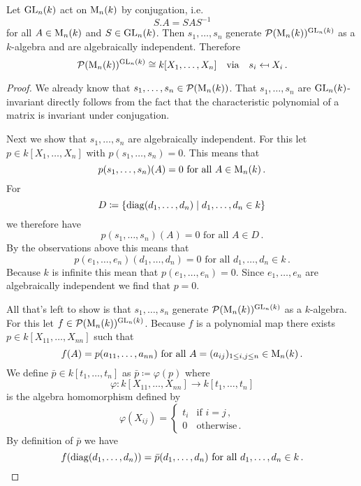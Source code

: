 \begin{thrm}
  Let $\operatorname{GL}_n(k)$ act on $\operatorname{M}_n(k)$ by conjugation, i.e.\
  \[
      S.A
    = SAS^{-1}
  \]
  for all $A \in \operatorname{M}_n(k)$ and $S \in \operatorname{GL}_n(k)$.
  Then $s_1, \dotsc, s_n$ generate $\mathcal{P}(\operatorname{M}_n(k))^{\operatorname{GL}_n(k)}$ as a $k$-algebra and are algebraically independent.
  Therefore
  \[
              \mathcal{P}(\operatorname{M}_n(k))^{\operatorname{GL}_n(k)}
    \cong     k[X_1, \dotsc, X_n]
    \quad\text{via}\quad
              s_i
    \mapsfrom X_i \,.
  \]
\end{thrm}
\begin{proof}
  We already know that $s_1, \dotsc, s_n \in \mathcal{P}(\operatorname{M}_n(k))$.
  That $s_1, \dotsc, s_n$ are $\operatorname{GL}_n(k)$-invariant directly follows from the fact that the characteristic polynomial of a matrix is invariant under conjugation.
  
  Next we show that $s_1, \dotsc, s_n$ are algebraically independent.
  For this let $p \in k[X_1, \dotsc, X_n]$ with $p(s_1, \dotsc, s_n) = 0$.
  This means that
  \[
        p(s_1, \dotsc, s_n)(A)
    =   0
    \text{ for all }
        A
    \in \operatorname{M}_n(k) \,.
  \]
  For
  \[
              D
    \coloneqq \{
                \operatorname{diag}(d_1, \dotsc, d_n)
              \mid
                    d_1, \dotsc, d_n
                \in k
              \}
  \]
  we therefore have
  \[
      p(s_1, \dotsc, s_n)(A)
    = 0
    \text{ for all }
        A
    \in D \,.
  \]
  By the observations above this means that 
  \[
      p(e_1, \dotsc, e_n)(d_1, \dotsc, d_n)
    = 0
    \text{ for all }
        d_1, \dotsc, d_n
    \in k \,.
  \]
  Because $k$ is infinite this mean that $p(e_1, \dotsc, e_n) = 0$.
  Since $e_1, \dotsc, e_n$ are algebraically independent we find that $p =0$.
  
  All that’s left to show is that $s_1, \dotsc, s_n$ generate $\mathcal{P}(\operatorname{M}_n(k))^{\operatorname{GL}_n(k)}$ as a $k$-algebra.
  For this let $f \in \mathcal{P}(\operatorname{M}_n(k))^{\operatorname{GL}_n(k)}$.
  Because $f$ is a polynomial map there exists $p \in k[X_{11}, \dotsc, X_{nn}]$ such that
  \[
      f(A)
    = p(a_{11}, \dotsc, a_{nn})
    \text{ for all }
        A
    =   (a_{ij})_{1 \leq i,j \leq n}
    \in \operatorname{M}_n(k) \,.
  \]
  We define $\bar{p} \in k[t_1, \dotsc, t_n]$ as $\bar{p} \coloneqq \varphi(p)$ where
  \[
            \varphi
    \colon  k[X_{11}, \dotsc, X_{nn}]
    \to     k[t_1, \dotsc, t_n]
  \]
  is the algebra homomorphism defined by
  \[
      \varphi(X_{ij})
    = \begin{cases}
        t_i & \text{if } i = j \,,  \\
          0 & \text{otherwise} \,.
      \end{cases}
  \]
  By definition of $\bar{p}$ we have
  \[
      f(\operatorname{diag}(d_1, \dotsc, d_n))
    = \bar{p}(d_1, \dotsc, d_n)
    \text{ for all }
        d_1, \dotsc, d_n
    \in k \,.
  \]
  

\end{proof}

